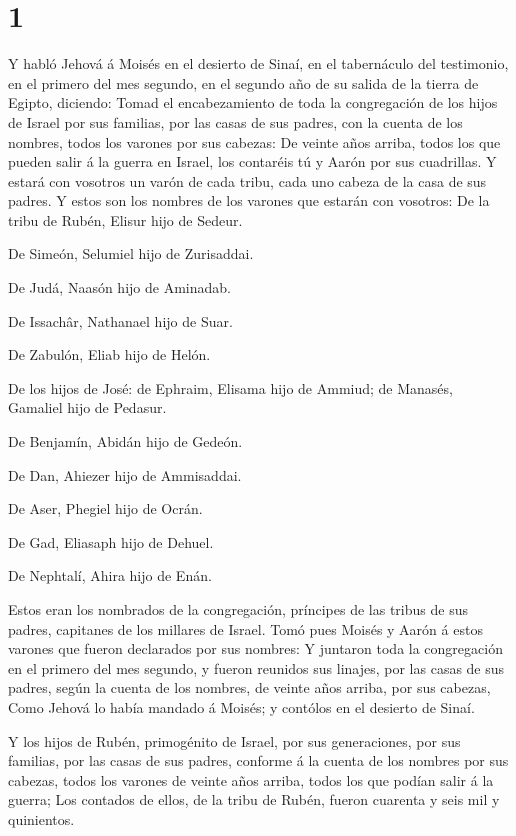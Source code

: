 \hypertarget{section}{%
\section{1}\label{section}}

 Y habló Jehová á Moisés en el desierto de Sinaí, en el
tabernáculo del testimonio, en el primero del mes segundo, en el segundo
año de su salida de la tierra de Egipto, diciendo:  Tomad el
encabezamiento de toda la congregación de los hijos de Israel por sus
familias, por las casas de sus padres, con la cuenta de los nombres,
todos los varones por sus cabezas:  De veinte años arriba,
todos los que pueden salir á la guerra en Israel, los contaréis tú y
Aarón por sus cuadrillas.  Y estará con vosotros un varón de
cada tribu, cada uno cabeza de la casa de sus padres.  Y
estos son los nombres de los varones que estarán con vosotros: De la
tribu de Rubén, Elisur hijo de Sedeur.

 De Simeón, Selumiel hijo de Zurisaddai.

 De Judá, Naasón hijo de Aminadab.

 De Issachâr, Nathanael hijo de Suar.

 De Zabulón, Eliab hijo de Helón.

 De los hijos de José: de Ephraim, Elisama hijo de Ammiud;
de Manasés, Gamaliel hijo de Pedasur.

 De Benjamín, Abidán hijo de Gedeón.

 De Dan, Ahiezer hijo de Ammisaddai.

 De Aser, Phegiel hijo de Ocrán.

 De Gad, Eliasaph hijo de Dehuel.

 De Nephtalí, Ahira hijo de Enán.

 Estos eran los nombrados de la congregación, príncipes de
las tribus de sus padres, capitanes de los millares de Israel.
 Tomó pues Moisés y Aarón á estos varones que fueron
declarados por sus nombres:  Y juntaron toda la
congregación en el primero del mes segundo, y fueron reunidos sus
linajes, por las casas de sus padres, según la cuenta de los nombres, de
veinte años arriba, por sus cabezas,  Como Jehová lo había
mandado á Moisés; y contólos en el desierto de Sinaí.

 Y los hijos de Rubén, primogénito de Israel, por sus
generaciones, por sus familias, por las casas de sus padres, conforme á
la cuenta de los nombres por sus cabezas, todos los varones de veinte
años arriba, todos los que podían salir á la guerra;  Los
contados de ellos, de la tribu de Rubén, fueron cuarenta y seis mil y
quinientos.

